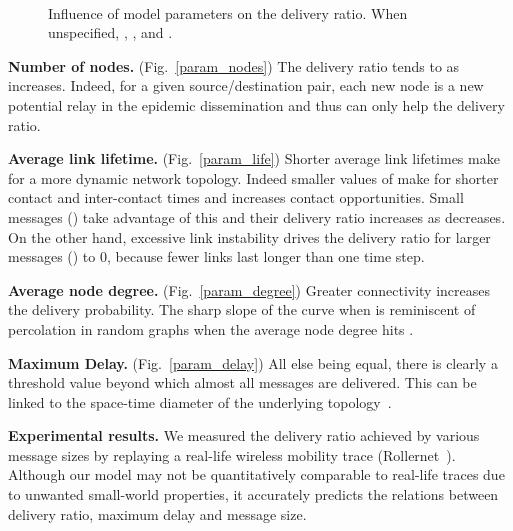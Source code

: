 \documentclass{sig-alt-release2}
\begin{document}
\begin{figure}[t]
  \centering
   \\
  \caption{Influence of model parameters on the delivery ratio. When unspecified, , ,
     and .}
  \label{params_influence}
\end{figure}

\vspace{1mm}
\noindent\textbf{Number of nodes.}
(Fig.~\ref{param_nodes}) The delivery ratio tends to  as 
increases. Indeed, for a given source/destination pair, each new node
is a new potential relay in the epidemic dissemination and thus can
only help the delivery ratio.

\vspace{1mm}
\noindent\textbf{Average link lifetime.}
(Fig.~\ref{param_life}) Shorter average link lifetimes make for a more
dynamic network topology. Indeed smaller values of  make for
shorter contact and inter-contact times and increases contact
opportunities. Small messages () take advantage of this
and their delivery ratio increases as  decreases. On the other
hand, excessive link instability drives the delivery ratio for larger
messages () to 0, because fewer links last longer than one
time step.

\vspace{1mm}
\noindent\textbf{Average node degree.}
(Fig.~\ref{param_degree}) Greater connectivity increases the delivery
probability. The sharp slope of the curve when  is
reminiscent of percolation in random graphs when the average node
degree hits .

\vspace{1mm}
\noindent\textbf{Maximum Delay.} (Fig.~\ref{param_delay})
All else being equal, there is clearly a threshold value beyond which
almost all messages are delivered. This can be linked to the space-time
diameter of the underlying topology~\cite{chaintreau_diam}.

\vspace{1mm}
\noindent\textbf{Experimental results.} 
We measured the delivery ratio achieved by various message sizes by
replaying a real-life wireless mobility trace
(Rollernet~\cite{tournoux08_rollernet}). Although our model may not be
quantitatively comparable to real-life traces due to unwanted
small-world properties, it accurately predicts the relations between
delivery ratio, maximum delay and message size.
\end{document}
